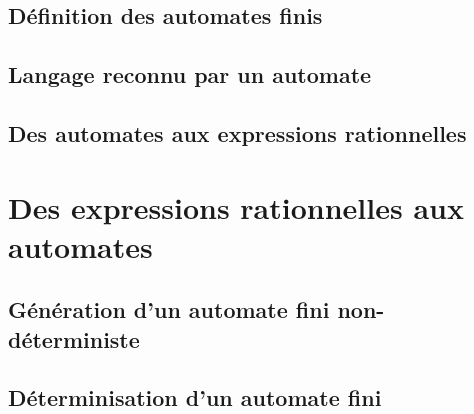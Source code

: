 \subsection{Définition des automates finis}





 
\subsection{Langage reconnu par un automate}








 
\subsection{Des automates aux expressions rationnelles}






 
\section{Des expressions rationnelles aux automates}
 
\subsection{Génération d'un automate fini non-déterministe}






 
\subsection{Déterminisation d'un automate fini}




 
